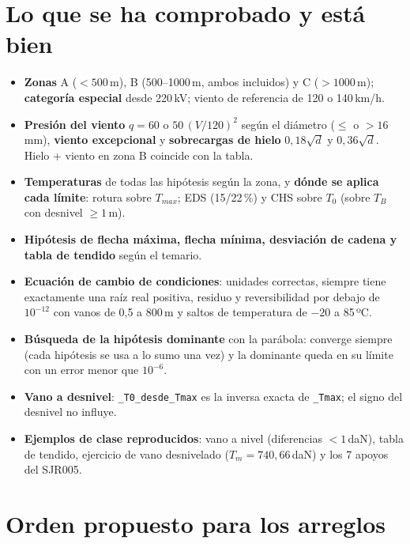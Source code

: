 \documentclass[11pt,a4paper]{article}
\newcommand{\code}[1]{\texttt{#1}}
\begin{document}
\section{Lo que se ha comprobado y está bien}

\begin{itemize}[leftmargin=1.5em]
  \item \textbf{Zonas} A ($<500$\,m), B (500--1000\,m, ambos incluidos) y C ($>1000$\,m); \textbf{categoría especial} desde 220\,kV; viento de referencia de 120 o 140\,km/h.
  \item \textbf{Presión del viento} $q=60$ o $50\,(V/120)^2$ según el diámetro ($\le$ o $>16$\,mm), \textbf{viento excepcional} y \textbf{sobrecargas de hielo} $0{,}18\sqrt d$ y $0{,}36\sqrt d$. Hielo + viento en zona B coincide con la tabla.
  \item \textbf{Temperaturas} de todas las hipótesis según la zona, y \textbf{dónde se aplica cada límite}: rotura sobre $T_{max}$; EDS (15/22\,\%) y CHS sobre $T_0$ (sobre $T_B$ con desnivel $\ge1$\,m).
  \item \textbf{Hipótesis de flecha máxima, flecha mínima, desviación de cadena y tabla de tendido} según el temario.
  \item \textbf{Ecuación de cambio de condiciones}: unidades correctas, siempre tiene exactamente una raíz real positiva, residuo y reversibilidad por debajo de $10^{-12}$ con vanos de 0,5 a 800\,m y saltos de temperatura de $-20$ a 85\,ºC.
  \item \textbf{Búsqueda de la hipótesis dominante} con la parábola: converge siempre (cada hipótesis se usa a lo sumo una vez) y la dominante queda en su límite con un error menor que $10^{-6}$.
  \item \textbf{Vano a desnivel}: \code{\_T0\_desde\_Tmax} es la inversa exacta de \code{\_Tmax}; el signo del desnivel no influye.
  \item \textbf{Ejemplos de clase reproducidos}: vano a nivel (diferencias $<1$\,daN), tabla de tendido, ejercicio de vano desnivelado ($T_m=740{,}66$\,daN) y los 7 apoyos del SJR005.
\end{itemize}

\section{Orden propuesto para los arreglos}
\end{document}
